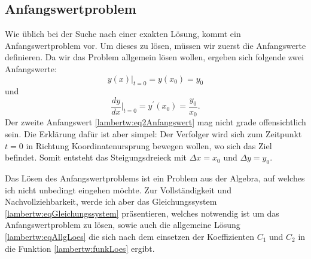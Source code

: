 \subsection{Anfangswertproblem 
	\label{lambertw:subsection:AllgLoes}}
Wie üblich bei der Suche nach einer exakten Lösung, kommt ein Anfangswertproblem vor. Um dieses zu lösen, müssen wir zuerst die Anfangswerte definieren. Da wir das Problem allgemein lösen wollen, ergeben sich folgende zwei Anfangswerte:
\begin{equation}
	y(x)\big \vert_{t=0}
	=
	y(x_0)
	= 
	y_0
	\label{lambertw:eq1Anfangswert}
\end{equation}
und
\begin{equation}
	\frac{dy}{dx}\bigg \vert_{t=0}
	=
	y^{\prime}(x_0)
	=
	\frac{y_0}{x_0}.
	\label{lambertw:eq2Anfangswert}
\end{equation}
Der zweite Anfangswert \eqref{lambertw:eq2Anfangswert} mag nicht grade offensichtlich sein. Die Erklärung dafür ist aber simpel: Der Verfolger wird sich zum Zeitpunkt \(t=0\) in Richtung Koordinatenursprung bewegen wollen, wo sich das Ziel befindet. Somit entsteht das Steigungsdreieck mit \(\Delta x = x_0\) und \(\Delta y = y_0\).

Das Lösen des Anfangswertproblems ist ein Problem aus der Algebra, auf welches ich nicht unbedingt eingehen möchte. Zur Vollständigkeit und Nachvollziehbarkeit, werde ich aber das Gleichungssystem \eqref{lambertw:eqGleichungssystem} präsentieren, welches notwendig ist um das Anfangswertproblem zu lösen, sowie auch die allgemeine Lösung \eqref{lambertw:eqAllgLoes} die sich nach dem einsetzen der Koeffizienten \(C_1\) und \(C_2\) in die Funktion \eqref{lambertw:funkLoes} ergibt.

